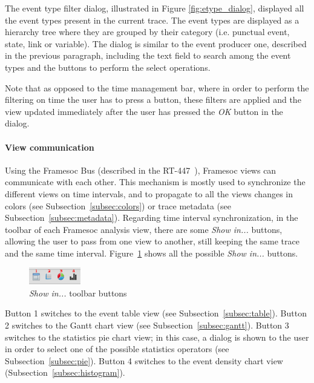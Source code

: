 \documentclass[twoside]{article}
\begin{document}
\begin{sloppypar}
The event type filter dialog, illustrated in Figure \ref{fig:etype_dialog}, displayed all the event types present in the current trace. The event types are displayed as a hierarchy tree where they are grouped by their category (i.e. punctual event, state, link or variable). The dialog is similar to the event producer one, described in the previous paragraph, including the text field to search among the event types and the buttons to perform the select operations.

Note that as opposed to the time management bar, where in order to perform the filtering on time the user has to press a button, these filters are applied and the view updated immediately after the user has pressed the \emph{OK} button in the dialog.

\paragraph{View communication} Using the Framesoc Bus (described in the RT-447~\cite{pagano:hal-00977887}), Framesoc views can communicate with each other. This mechanism is mostly used to synchronize the different views on time intervals, and to propagate to all the views changes in colors (see Subsection~\ref{subsec:colors}) or trace metadata (see Subsection~\ref{subsec:metadata}).
Regarding time interval synchronization, in the toolbar of each Framesoc analysis view, there are some \emph{Show in...} buttons, allowing the user to pass from one view to another, still keeping the same trace and the same time interval. Figure~\ref{fig:show_in} shows all the possible \emph{Show in...} buttons. 

\begin{figure}[h!]
  \centering
    \includegraphics[width=0.2\textwidth]{images/show_in_icons.png}
  \caption{\emph{Show in...} toolbar buttons}
  \label{fig:show_in}
\end{figure}

Button \num{1} switches to the event table view (see Subsection~\ref{subsec:table}). Button \num{2} switches to the Gantt chart view (see Subsection~\ref{subsec:gantt}). Button \num{3} switches to the statistics pie chart view; in this case, a dialog is shown to the user in order to select one of the possible statistics operators (see Subsection~\ref{subsec:pie}). Button \num{4} switches to the event density chart view (Subsection~\ref{subsec:histogram}).


\end{sloppypar}
\end{document}
